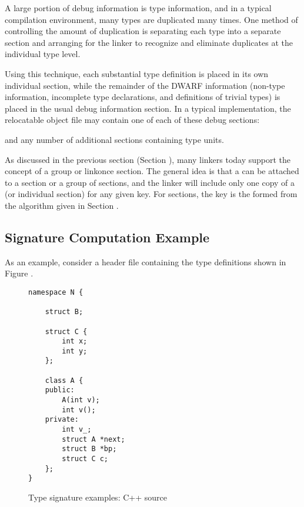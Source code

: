 A large portion of debug information is type information, and
in a typical compilation environment, many types are duplicated
many times. One method of controlling the amount of duplication
is separating each type into a separate 
\COMDAT{} \dotdebuginfo{} section
and arranging for the linker to recognize and eliminate
duplicates at the individual type level.

Using this technique, each substantial type definition is
placed in its own individual section, while the remainder
of the DWARF information (non-type information, incomplete
type declarations, and definitions of trivial types) is
placed in the usual debug information section. In a typical
implementation, the relocatable object file may contain one
of each of these debug sections:

\begin{alltt}
\dotdebugabbrev{}
\dotdebuginfo{}
\dotdebugline{}
\end{alltt}

and any number of additional \COMDAT{} \dotdebuginfo{} sections
containing type units.

As discussed in the previous section 
(Section ), 
many
linkers today support the concept of a \COMDAT{} group or
linkonce section. The general idea is that a  can be
attached to a section or a group of sections, and the linker
will include only one copy of a 
(or individual section) for any given key. 
For \COMDAT{} \dotdebuginfo{} sections, the
key is the 
formed from the algorithm given in
Section .

\subsection{Signature Computation Example}
\label{app:signaturecomputationexample}

As an example, 
consider a  header file 
containing the type definitions shown
in Figure .

\begin{figure}[h]
\begin{lstlisting}
namespace N {

    struct B;

    struct C {
        int x;
        int y;
    };

    class A {
    public:
        A(int v);
        int v();
    private:
        int v_;
        struct A *next;
        struct B *bp;
        struct C c;
    };
}
\end{lstlisting}
\caption{Type signature examples: C++ source}
\label{fig:typesignatureexamplescsource}
\end{figure}

